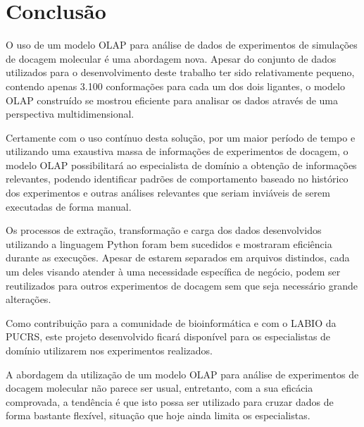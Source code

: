 \chapter{Conclusão}

O uso de um modelo OLAP para análise de dados de experimentos de simulações de docagem molecular é uma abordagem nova. Apesar do conjunto de dados utilizados para o desenvolvimento deste trabalho ter sido relativamente pequeno, contendo apenas 3.100 conformações para cada um dos dois ligantes, o modelo OLAP construído se mostrou eficiente para analisar os dados através de uma perspectiva multidimensional.

Certamente com o uso contínuo desta solução, por um maior período de tempo e utilizando uma exaustiva massa de informações de experimentos de docagem, o modelo OLAP possibilitará ao especialista de domínio a obtenção de informações relevantes, podendo identificar padrões de comportamento baseado no histórico dos experimentos e outras análises relevantes que seriam inviáveis de serem executadas de forma manual.

Os processos de extração, transformação e carga dos dados desenvolvidos utilizando a linguagem Python foram bem sucedidos e mostraram eficiência durante as execuções. Apesar de estarem separados em arquivos distindos, cada um deles visando atender à uma necessidade específica de negócio, podem ser reutilizados para outros experimentos de docagem sem que seja necessário grande alterações.

Como contribuição para a comunidade de bioinformática e com o LABIO da PUCRS, este projeto desenvolvido ficará disponível para os especialistas de domínio utilizarem nos experimentos realizados.

A abordagem da utilização de um modelo OLAP para análise de experimentos de docagem molecular não parece ser usual, entretanto, com a sua eficácia comprovada, a tendência é que isto possa ser utilizado para cruzar dados de forma bastante flexível, situação que hoje ainda limita os especialistas.